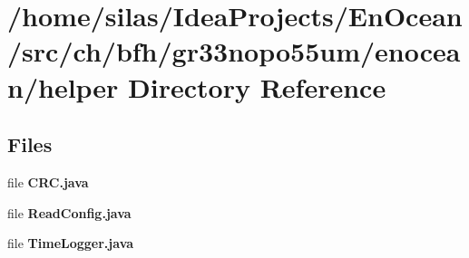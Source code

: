 \section{/home/silas/\+Idea\+Projects/\+En\+Ocean/src/ch/bfh/gr33nopo55um/enocean/helper Directory Reference}
\label{dir_f59d46c0651d764281e2391e6f7ebba6}
\subsection*{Files}
\begin{DoxyCompactItemize}
\item 
file {\bf C\+R\+C.\+java}
\item 
file {\bf Read\+Config.\+java}
\item 
file {\bf Time\+Logger.\+java}
\end{DoxyCompactItemize}
